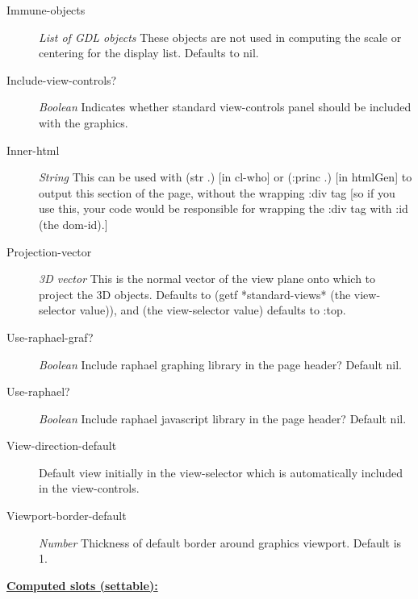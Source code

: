\documentclass [11pt]{book}
\begin{document}
\begin{itemize}
\begin{description}
\item [Immune-objects]
\emph{List of GDL objects} These objects are not used in
computing the scale or centering for the display list.
Defaults to nil.


\item [Include-view-controls?]
\emph{Boolean} Indicates whether standard view-controls panel should be included with the graphics.


\item [Inner-html]
\emph{String} This can be used with (str .) [in cl-who] or (:princ .) [in htmlGen]
to output this section of the page, without the wrapping :div tag [so if you use this,
your code would be responsible for wrapping the :div tag with :id (the dom-id).]


\item [Projection-vector]
\emph{3D vector} This is the normal vector of the view plane onto
which to project the 3D objects. Defaults to
(getf *standard-views* (the view-selector value)),
and (the view-selector value) defaults to :top.


\item [Use-raphael-graf?]
\emph{Boolean} Include raphael graphing library in the page header?
Default nil.


\item [Use-raphael?]
\emph{Boolean} Include raphael javascript library in the page header?
Default nil.


\item [View-direction-default]
Default view initially in the view-selector which is
automatically included in the view-controls.


\item [Viewport-border-default]
\emph{Number} Thickness of default border around graphics viewport.
Default is 1.


\end{description}






\textbf{
\underline{Computed slots (settable):}}

\begin{description}


\end{description}
\end{itemize}
\end{document}
